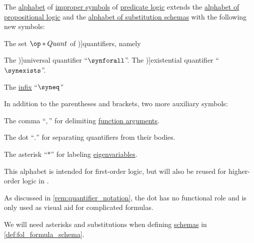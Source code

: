 \begin{definition}\label{def:predicate_logic_alphabet}\mimprovised
  The \hyperref[def:formal_language/alphabet]{alphabet} of \hyperref[con:improper_symbol]{improper symbols} of \hyperref[con:predicate_logic]{predicate logic} extends the \hyperref[def:propositional_alphabet]{alphabet of propositional logic} and the \hyperref[def:substitution_schema_alphabet]{alphabet of substitution schemas} with the following new symbols:
  \begin{thmenum}
     The set \( \op*{Quant} \) of \term[ru=кванторы (\cite[82]{Герасимов2014Вычислимость})]{quantifiers}, namely
    \begin{thmenum}
       The \term[ru=квантор всеобщости (\cite[86]{Герасимов2014Вычислимость})]{universal quantifier} \enquote{\( \synforall \)}.
       The \term[ru=квантор существования (\cite[86]{Герасимов2014Вычислимость})]{existential quantifier} \enquote{\( \synexists \)}.
    \end{thmenum}

     The \hyperref[def:fol_signature/notation]{infix}  \enquote{\( \syneq \)}

     In addition to the parentheses and brackets, two more auxiliary symbols:
    \begin{thmenum}
       The comma \enquote{\( , \)} for delimiting \hyperref[con:function_arguments]{function arguments}.

       The dot \enquote{\( . \)} for separating quantifiers from their bodies.

       The asterisk \enquote{\( * \)} for labeling \hyperref[def:fol_natural_deduction_proof_tree/eigenvariables]{eigenvariables}.
    \end{thmenum}
  \end{thmenum}
\end{definition}
\begin{comments}
  \item This alphabet is intended for first-order logic, but will also be reused for higher-order logic in .

  \item As discussed in \cref{rem:quantifier_notation}, the dot has no functional role and is only used as visual aid for complicated formulas.

  \item We will need asterisks and substitutions when defining \hyperref[con:schemas_and_instances]{schemas} in \cref{def:fol_formula_schema}.
\end{comments}


